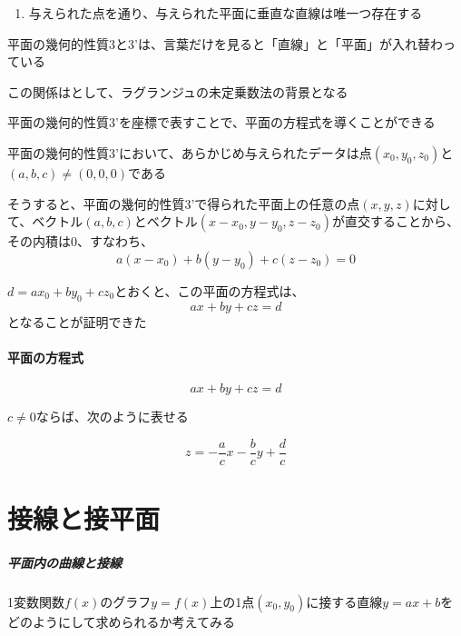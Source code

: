 \documentclass[../book_jiriki_calc]{subfiles}
\begin{document}
\begin{enumerate}[label={\arabic*'},start=3]
  \item 与えられた点を通り、与えられた平面に垂直な直線は唯一つ存在する
\end{enumerate}
  
\br

平面の幾何的性質3と3'は、言葉だけを見ると「直線」と「平面」が入れ替わっている

この関係はとして、ラグランジュの未定乗数法の背景となる

\sectionline

平面の幾何的性質3'を座標で表すことで、平面の方程式を導くことができる

\br

平面の幾何的性質3'において、あらかじめ与えられたデータは点$(x_0,y_0,z_0)$と$(a,b,c) \neq (0,0,0)$である

そうすると、平面の幾何的性質3'で得られた平面上の任意の点$(x,y,z)$に対して、ベクトル$(a,b,c)$とベクトル$(x-x_0,y-y_0,z-z_0)$が直交することから、その内積は$0$、すなわち、
\begin{equation*}
  a(x-x_0) + b(y-y_0) + c(z-z_0) = 0
\end{equation*}

$d=ax_0+by_0+cz_0$とおくと、この平面の方程式は、
\begin{equation}
  ax + by + cz = d
\end{equation}
となることが証明できた

\br

\paragraph{平面の方程式}

\begin{equation*}
  ax + by + cz = d
\end{equation*}

$c\neq 0$ならば、次のように表せる

\begin{equation*}
  z = -\frac{a}{c}x - \frac{b}{c}y + \frac{d}{c}
\end{equation*}

\section{接線と接平面}

\subparagraph{平面内の曲線と接線}

1変数関数$f(x)$のグラフ$y=f(x)$上の1点$(x_0,y_0)$に接する直線$y=ax+b$をどのようにして求められるか考えてみる
\end{document}
